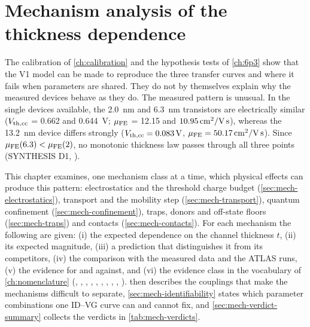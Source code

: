 \chapter{Mechanism analysis of the thickness dependence}\label{ch:mechanisms}

The calibration of \cref{ch:calibration} and the hypothesis tests of \cref{ch:6p3} show that the V1 model can be made to reproduce the three transfer curves and where it fails when parameters are shared. They do not by themselves explain why the measured devices behave as they do. The measured pattern is unusual. In the single devices available, the \SI{2.0}{nm} and \SI{6.3}{nm} transistors are electrically similar ($V_{\mathrm{th,cc}}$ = 0.662 and \SI{0.644}{V}; $\mu_{\mathrm{FE}}$ = 12.15 and $10.95\,\mathrm{cm}^{2}/\mathrm{V\,s}$), whereas the \SI{13.2}{nm} device differs strongly ($V_{\mathrm{th,cc}} = \SI{0.083}{V}$, $\mu_{\mathrm{FE}} = 50.17\,\mathrm{cm}^{2}/\mathrm{V\,s}$). Since $\mu_{\mathrm{FE}}(6.3) < \mu_{\mathrm{FE}}(2)$, no monotonic thickness law passes through all three points (SYNTHESIS D1, \evDATA).

This chapter examines, one mechanism class at a time, which physical effects can produce this pattern: electrostatics and the threshold charge budget (\cref{sec:mech-electrostatics}), transport and the mobility step (\cref{sec:mech-transport}), quantum confinement (\cref{sec:mech-confinement}), traps, donors and off-state floors (\cref{sec:mech-traps}) and contacts (\cref{sec:mech-contacts}). For each mechanism the following are given: (i) the expected dependence on the channel thickness $t$, (ii) its expected magnitude, (iii) a prediction that distinguishes it from its competitors, (iv) the comparison with the measured data and the ATLAS runs, (v) the evidence for and against, and (vi) the evidence class in the vocabulary of \cref{ch:nomenclature} (\evDATA, \evNUM, \evCAL, \evOOS, \evPOST, \evPRED, \evSURR, \evTHEORY, \evLIT, \evCORR).  then describes the couplings that make the mechanisms difficult to separate, \cref{sec:mech-identifiability} states which parameter combinations one ID--VG curve can and cannot fix, and \cref{sec:mech-verdict-summary} collects the verdicts in \cref{tab:mech-verdicts}.

